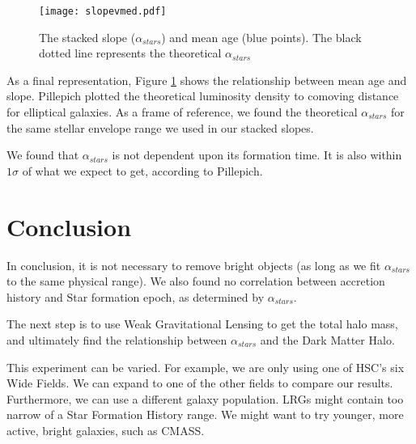 \documentclass{article}
\begin{document}
\begin{figure}[h!]
\centering
\texttt{[image: slopevmed.pdf]}
\caption{The stacked slope ($\alpha_{stars}$) and mean age (blue points). The black dotted line represents the theoretical  $\alpha_{stars}$}
\label{fig:svm}
\end{figure}

As a final representation, Figure \ref{fig:svm} shows the relationship between mean age and slope. Pillepich plotted the theoretical luminosity density to comoving distance for elliptical galaxies. As a frame of reference, we found the theoretical  $\alpha_{stars}$ for the same stellar envelope range we used in our stacked slopes.

We found that  $\alpha_{stars}$ is not dependent upon its formation time. It is also within $1\sigma$ of what we expect to get, according to Pillepich. 


\section{Conclusion}

In conclusion, it is not necessary to remove bright objects (as long as we fit $\alpha_{stars}$ to the same physical range). We also found no correlation between accretion history and Star formation epoch, as determined by $\alpha_{stars}$. 

The next step is to use Weak Gravitational Lensing to get the total halo mass, and ultimately find the relationship between $\alpha_{stars}$ and the Dark Matter Halo.

This experiment can be varied. For example, we are only using one of HSC's six Wide Fields. We can expand to one of the other fields to compare our results. Furthermore, we can use a different galaxy population. LRGs might contain too narrow of a Star Formation History range. We might want to try younger, more active, bright galaxies, such as CMASS.
\end{document}
